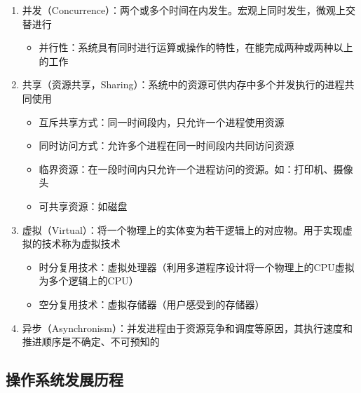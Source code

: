 \documentclass[./operating-systems.tex]{subfiles}
\begin{document}
    \begin{enumerate}
        \item 并发（Concurrence）：两个或多个时间在{\color{red}{同一时间间隔}}内发生。宏观上同时发生，微观上交替进行
        \begin{itemize}
            \item 并行性：系统具有同时进行运算或操作的特性，在{\color{red}{同一时刻}}能完成两种或两种以上的工作
        \end{itemize}
        \item 共享（资源共享，Sharing）：系统中的资源可供内存中多个并发执行的进程共同使用
        \begin{itemize}
            \item 互斥共享方式：同一时间段内，只允许一个进程使用资源
            \item 同时访问方式：允许多个进程在同一时间段内共同访问资源
            \item 临界资源：在一段时间内只允许一个进程访问的资源。如：打印机、摄像头
            \item 可共享资源：如磁盘
        \end{itemize}
        \item 虚拟（Virtual）：将一个物理上的实体变为若干逻辑上的对应物。用于实现虚拟的技术称为虚拟技术
        \begin{itemize}
            \item 时分复用技术：虚拟处理器（利用多道程序设计将一个物理上的CPU虚拟为多个逻辑上的CPU）
            \item 空分复用技术：虚拟存储器（用户感受到的存储器）
        \end{itemize}
        \item 异步（Asynchronism）：并发进程由于资源竞争和调度等原因，其执行速度和推进顺序是不确定、不可预知的
    \end{enumerate}

    \subsection{操作系统发展历程}
\end{document}
